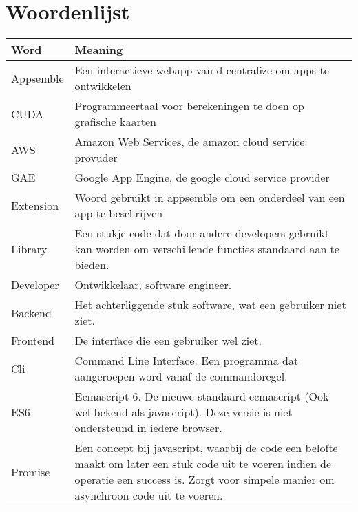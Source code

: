 \chapter{Woordenlijst}
\begin{tabular}{|p{3cm}|p{11cm}|}
	\hline
	\textbf{Word} & \textbf{Meaning} \\
	\hline
	Appsemble & Een interactieve webapp van d-centralize om apps te ontwikkelen\\ \hline
	CUDA & Programmeertaal voor berekeningen te doen op grafische kaarten \\ \hline
	AWS & Amazon Web Services, de amazon cloud service provuder \\ \hline
	GAE & Google App Engine, de google cloud service provider \\ \hline
	Extension & Woord gebruikt in appsemble om een onderdeel van een app te beschrijven \\ \hline
	Library & Een stukje code dat door andere developers gebruikt kan worden om verschillende functies standaard aan te bieden. \\ \hline
	Developer & Ontwikkelaar, software engineer. \\ \hline
	Backend & Het achterliggende stuk software, wat een gebruiker niet ziet. \\ \hline
	Frontend & De interface die een gebruiker wel ziet. \\ \hline
	Cli & Command Line Interface. Een programma dat aangeroepen word vanaf de commandoregel. \\ \hline	
	ES6 & Ecmascript 6. De nieuwe standaard ecmascript (Ook wel bekend als javascript). Deze versie is niet ondersteund in iedere browser. \\ \hline
	Promise & Een concept bij javascript, waarbij de code een belofte maakt om later een stuk code uit te voeren indien de operatie een success is. Zorgt voor simpele manier om asynchroon code uit te voeren. \\ \hline
\end{tabular}